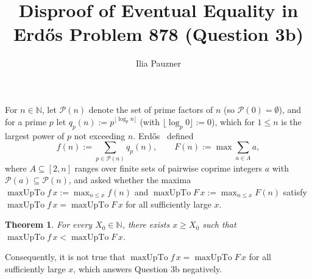 \documentclass[11pt,a4paper]{amsart}
\title{Disproof of Eventual Equality in Erd\H{o}s Problem 878 (Question 3b)}
\author{Ilia Pauzner}
\date{}
\newtheorem*{theorem}{Theorem}
\newcommand{\maxUpTo}{\operatorname{maxUpTo}}
\begin{document}
\maketitle

For $n \in \mathbb{N}$, let $\mathcal{P}(n)$ denote the set of prime factors of $n$ (so $\mathcal{P}(0) = \emptyset$), and for a prime $p$ let $q_p(n) := p^{\lfloor \log_p n \rfloor}$ (with $\lfloor \log_p 0 \rfloor := 0$), which for $1 \le n$ is the largest power of $p$ not exceeding $n$. Erd\H{o}s~\cite{Er84e} defined
\[
f(n) := \sum_{p \in \mathcal{P}(n)} q_p(n), \qquad F(n) := \max \sum_{a \in A} a,
\]
where $A \subseteq [2, n]$ ranges over finite sets of pairwise coprime integers $a$ with $\mathcal{P}(a) \subseteq \mathcal{P}(n)$, and asked whether the maxima $\maxUpTo f\, x := \max_{n \le x} f(n)$ and $\maxUpTo F\, x := \max_{n \le x} F(n)$ satisfy $\maxUpTo f\, x = \maxUpTo F\, x$ for all sufficiently large $x$.

\begin{theorem}
For every $X_0 \in \mathbb{N}$, there exists $x \ge X_0$ such that $\maxUpTo f\, x < \maxUpTo F\, x$.
\end{theorem}

Consequently, it is not true that $\maxUpTo f\, x = \maxUpTo F\, x$ for all sufficiently large $x$, which answers Question 3b negatively.
\end{document}
